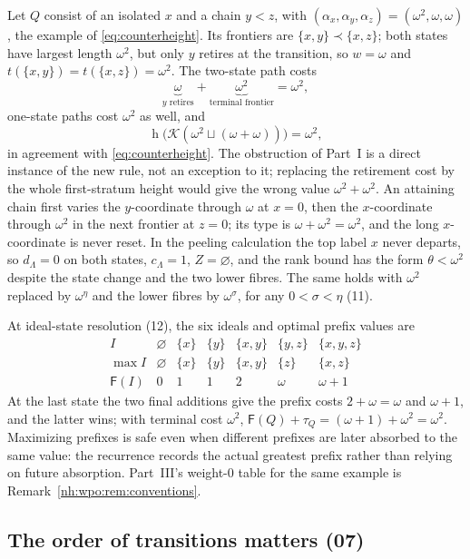 \documentclass[11pt,a4paper]{article}
\theoremstyle{definition}
\theoremstyle{remark}
\newcommand{\K}{\mathcal K}
\newcommand{\hgt}{\operatorname{h}}
\newcommand{\Fdp}{\mathsf F}
\begin{document}
Let $Q$ consist of an isolated $x$ and a chain $y<z$, with
$(\alpha_x,\alpha_y,\alpha_z)=(\omega^2,\omega,\omega)$, the example of
\eqref{eq:counterheight}. Its frontiers are $\{x,y\}\prec\{x,z\}$; both
states have largest length $\omega^2$, but only $y$ retires at the
transition, so $w=\omega$ and $t(\{x,y\})=t(\{x,z\})=\omega^2$. The two-state
path costs
\[
 \underbrace{\omega}_{y\text{ retires}}+
 \underbrace{\omega^2}_{\text{terminal frontier}}=\omega^2,
\]
one-state paths cost $\omega^2$ as well, and
\begin{equation}\label{nh:eq:obstructionfixed}
 \hgt\bigl(\K(\omega^2\sqcup(\omega+\omega))\bigr)=\omega^2,
\end{equation}
in agreement with \eqref{eq:counterheight}. The obstruction of Part~I is a
direct instance of the new rule, not an exception to it; replacing the
retirement cost by the whole first-stratum height would give the wrong value
$\omega^2+\omega^2$. An attaining chain first varies the $y$-coordinate through
$\omega$ at $x=0$, then the $x$-coordinate through $\omega^2$ in the next
frontier at $z=0$; its type is $\omega+\omega^2=\omega^2$, and the long
$x$-coordinate is never reset. In the peeling calculation the top label $x$
never departs, so $d_\Lambda=0$ on both states, $c_\Lambda=1$, $Z=\varnothing$,
and the rank bound has the form $\theta<\omega^2$ despite the state change and
the two lower fibres. The same holds with $\omega^2$ replaced by $\omega^\eta$
and the lower fibres by $\omega^\sigma$, for any $0<\sigma<\eta$ (11).

At ideal-state resolution (12), the six ideals and optimal prefix values are
\[
\begin{array}{c|cccccc}
 I&\varnothing&\{x\}&\{y\}&\{x,y\}&\{y,z\}&\{x,y,z\}\\ \hline
 \max I&\varnothing&\{x\}&\{y\}&\{x,y\}&\{z\}&\{x,z\}\\
 \Fdp(I)&0&1&1&2&\omega&\omega+1
\end{array}
\]
At the last state the two final additions give the prefix costs $2+\omega=\omega$
and $\omega+1$, and the latter wins; with terminal cost $\omega^2$,
$\Fdp(Q)+\tau_Q=(\omega+1)+\omega^2=\omega^2$. Maximizing prefixes is safe even
when different prefixes are later absorbed to the same value: the recurrence
records the actual greatest prefix rather than relying on future absorption.
Part~III's weight-$0$ table for the same example is
Remark~\ref{nh:wpo:rem:conventions}.

\subsection{The order of transitions matters (07)}
\end{document}
